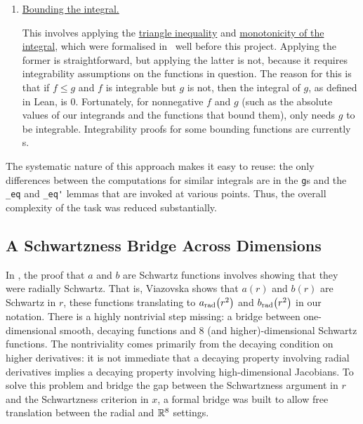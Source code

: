 \begin{enumerate}
    \item \underline{Bounding the integral.}

    This involves applying the \href{https://github.com/leanprover-community/mathlib4/blob/5a2eaa85c555c4263e15928cef249cbaad2eb2d2/Mathlib/MeasureTheory/Integral/Bochner/Basic.lean#L927}{triangle inequality} and \href{https://github.com/leanprover-community/mathlib4/blob/5a2eaa85c555c4263e15928cef249cbaad2eb2d2/Mathlib/MeasureTheory/Integral/Bochner/Set.lean#L645}{monotonicity of the integral}, which were formalised in \mathlib\ well before this project. Applying the former is straightforward, but applying the latter is not, because it requires integrability assumptions on the functions in question. The reason for this is that if $f \leq g$ and $f$ is integrable but $g$ is not, then the integral of $g$, as defined in Lean, is $0$. Fortunately, for nonnegative $f$ and $g$ (such as the absolute values of our integrands and the functions that bound them), only needs $g$ to be integrable. Integrability proofs for some bounding functions are currently \sorry s.
\end{enumerate}

The systematic nature of this approach makes it easy to reuse: the only differences between the computations for similar integrals are in the \lstinline|g|s and the \lstinline|_eq| and \lstinline|_eq'| lemmas that are invoked at various points. Thus, the overall complexity of the task was reduced substantially.

\subsection{A Schwartzness Bridge Across Dimensions}
\label{Ch5:Subsec:Schwartz_Bridge}


In \cite{Viazovska8}, the proof that $a$ and $b$ are Schwartz functions involves showing that they were radially Schwartz. That is, Viazovska shows that $a(r)$ and $b(r)$ are Schwartz in $r$, these functions translating to $a_{\operatorname{rad}}\!\left( r^2 \right)$ and $b_{\operatorname{rad}}\!\left( r^2 \right)$ in our notation. There is a highly nontrivial step missing: a bridge between one-dimensional smooth, decaying functions and $8$ (and higher)-dimensional Schwartz functions. The nontriviality comes primarily from the decaying condition on higher derivatives: it is not immediate that a decaying property involving radial derivatives implies a decaying property involving high-dimensional Jacobians. To solve this problem and bridge the gap between the Schwartzness argument in $r$ and the Schwartzness criterion in $x$, a formal bridge was built to allow free translation between the radial and $\mathbb{R}^8$ settings.

